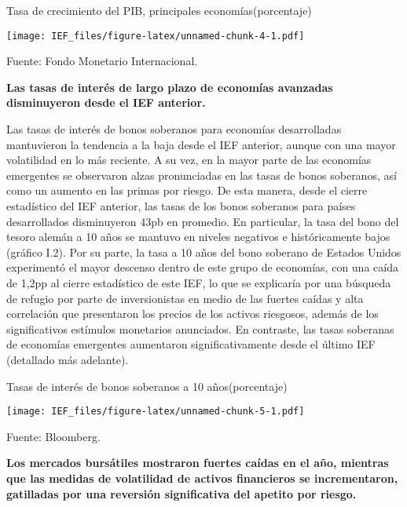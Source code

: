 \documentclass[
]{book}
\begin{document}
Tasa de crecimiento del PIB, principales economías(porcentaje)

\texttt{[image: IEF\_files/figure-latex/unnamed-chunk-4-1.pdf]}

Fuente: Fondo Monetario Internacional.

\textbf{Las tasas de interés de largo plazo de economías avanzadas disminuyeron desde el IEF anterior.}

Las tasas de interés de bonos soberanos para economías desarrolladas
mantuvieron la tendencia a la baja desde el IEF anterior, aunque con una mayor
volatilidad en lo más reciente. A su vez, en la mayor parte de las economías
emergentes se observaron alzas pronunciadas en las tasas de bonos soberanos,
así como un aumento en las primas por riesgo. De esta manera, desde el cierre
estadístico del IEF anterior, las tasas de los bonos soberanos para países
desarrollados disminuyeron 43pb en promedio. En particular, la tasa del bono
del tesoro alemán a 10 años se mantuvo en niveles negativos e históricamente
bajos (gráfico I.2). Por su parte, la tasa a 10 años del bono soberano de Estados
Unidos experimentó el mayor descenso dentro de este grupo de economías,
con una caída de 1,2pp al cierre estadístico de este IEF, lo que se explicaría por
una búsqueda de refugio por parte de inversionistas en medio de las fuertes
caídas y alta correlación que presentaron los precios de los activos riesgosos,
además de los significativos estímulos monetarios anunciados. En contraste,
las tasas soberanas de economías emergentes aumentaron significativamente
desde el último IEF (detallado más adelante).

Tasas de interés de bonos soberanos a 10 años(porcentaje)

\texttt{[image: IEF\_files/figure-latex/unnamed-chunk-5-1.pdf]}

Fuente: Bloomberg.

\textbf{Los mercados bursátiles mostraron fuertes caídas en el año, mientras que las medidas de volatilidad de activos financieros se incrementaron, gatilladas por una reversión significativa del apetito por riesgo.}
\end{document}
